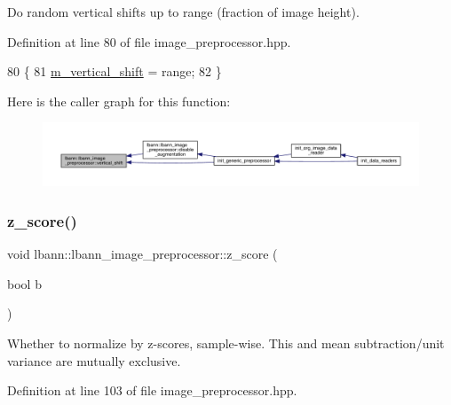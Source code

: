 Do random vertical shifts up to range (fraction of image height). 

Definition at line 80 of file image\+\_\+preprocessor.\+hpp.


\begin{DoxyCode}
80                                    \{
81     \hyperlink{classlbann_1_1lbann__image__preprocessor_a06158637d634a4d123ee5501ddd0c7cb}{m\_vertical\_shift} = range;
82   \}
\end{DoxyCode}
Here is the caller graph for this function\+:\nopagebreak
\begin{figure}[H]
\begin{center}
\leavevmode
\includegraphics[width=350pt]{classlbann_1_1lbann__image__preprocessor_a50ac63e1f6b1b9806cbf6c06f53f4aca_icgraph}
\end{center}
\end{figure}
\mbox{\label{classlbann_1_1lbann__image__preprocessor_a02cfd4d8c26a317540b587eb52cef0d5}} 
\subsubsection{\texorpdfstring{z\+\_\+score()}{z\_score()}\hspace{0.1cm}{\footnotesize\ttfamily [1/2]}}
{\footnotesize\ttfamily void lbann\+::lbann\+\_\+image\+\_\+preprocessor\+::z\+\_\+score (\begin{DoxyParamCaption}\item[{bool}]{b }\end{DoxyParamCaption})\hspace{0.3cm}{\ttfamily [inline]}}

Whether to normalize by z-\/scores, sample-\/wise. This and mean subtraction/unit variance are mutually exclusive. 

Definition at line 103 of file image\+\_\+preprocessor.\+hpp.


